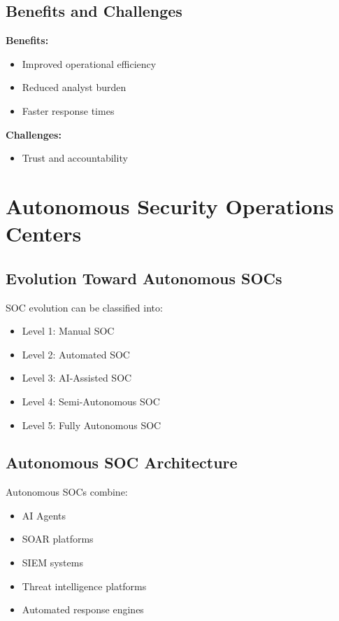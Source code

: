 \documentclass[12pt,a4paper]{report}
\begin{document}
\subsection{Benefits and Challenges}
\textbf{Benefits:}
\begin{itemize}
    \item Improved operational efficiency
    \item Reduced analyst burden
    \item Faster response times
\end{itemize}

\textbf{Challenges:}
\begin{itemize}
    \item Trust and accountability
\end{itemize}

\section{Autonomous Security Operations Centers}
\label{sec:autonomous_soc}

\subsection{Evolution Toward Autonomous SOCs}
SOC evolution can be classified into:
\begin{itemize}
    \item Level 1: Manual SOC
    \item Level 2: Automated SOC
    \item Level 3: AI-Assisted SOC
    \item Level 4: Semi-Autonomous SOC
    \item Level 5: Fully Autonomous SOC
\end{itemize}

\subsection{Autonomous SOC Architecture}
Autonomous SOCs combine:
\begin{itemize}
    \item AI Agents
    \item SOAR platforms
    \item SIEM systems
    \item Threat intelligence platforms
    \item Automated response engines
\end{itemize}
\end{document}
